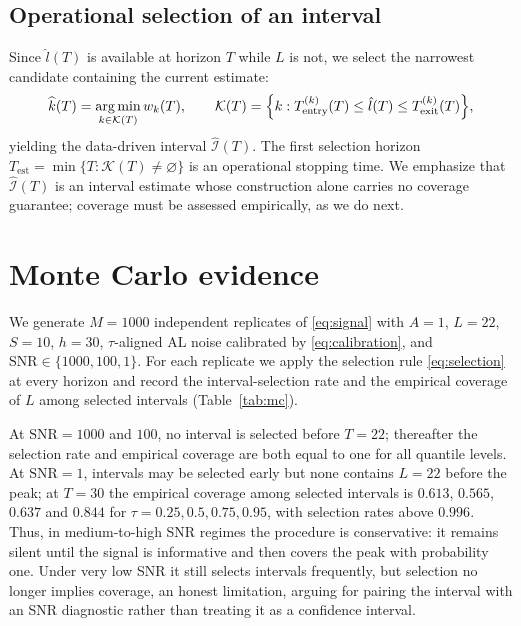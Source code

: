 \documentclass[11pt,a4paper]{article}
\begin{document}
\subsection{Operational selection of an interval}

Since $\hat l(T)$ is available at horizon $T$ while $L$ is not, we select the
narrowest candidate containing the current estimate:
\begin{equation}
\widehat k(T)=\underset{k\in\mathcal K(T)}{\operatorname{arg\,min}}\,w_k(T),
\qquad
\mathcal K(T)=\Bigl\{k:T_{\mathrm{entry}}^{(k)}(T)\le\hat l(T)\le
T_{\mathrm{exit}}^{(k)}(T)\Bigr\},
\label{eq:selection}
\end{equation}
yielding the data-driven interval $\widehat{\mathcal I}(T)$. The first
selection horizon
$T_{\mathrm{est}}=\min\{T:\mathcal K(T)\neq\varnothing\}$ is an operational
stopping time. We emphasize that $\widehat{\mathcal I}(T)$ is an interval
estimate whose construction alone carries no coverage guarantee; coverage must
be assessed empirically, as we do next.

\section{Monte Carlo evidence}
\label{sec:mc}

We generate $M=1000$ independent replicates of \eqref{eq:signal} with
$A=1$, $L=22$, $S=10$, $h=30$, $\tau$-aligned AL noise calibrated by
\eqref{eq:calibration}, and $\mathrm{SNR}\in\{1000,100,1\}$. For each
replicate we apply the selection rule \eqref{eq:selection} at every horizon
and record the interval-selection rate and the empirical coverage of $L$ among
selected intervals (Table~\ref{tab:mc}).

At $\mathrm{SNR}=1000$ and $100$, no interval is selected before $T=22$;
thereafter the selection rate and empirical coverage are both equal to one
for all quantile levels. At $\mathrm{SNR}=1$, intervals may be selected
early but none contains $L=22$ before the peak; at $T=30$ the empirical
coverage among selected intervals is $0.613$, $0.565$, $0.637$ and $0.844$
for $\tau=0.25,0.5,0.75,0.95$, with selection rates above $0.996$. Thus, in
medium-to-high SNR regimes the procedure is conservative: it remains silent
until the signal is informative and then covers the peak with probability
one. Under very low SNR it still selects intervals frequently, but selection
no longer implies coverage, an honest limitation, arguing for pairing the
interval with an SNR diagnostic rather than treating it as a confidence
interval.
\end{document}
